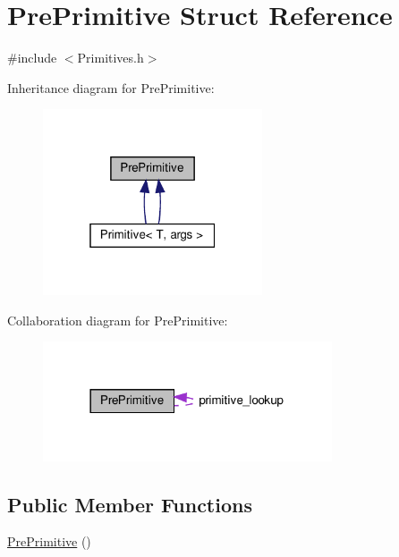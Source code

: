 \hypertarget{struct_pre_primitive}{}\section{Pre\+Primitive Struct Reference}
\label{struct_pre_primitive}


{\ttfamily \#include $<$Primitives.\+h$>$}



Inheritance diagram for Pre\+Primitive\+:\nopagebreak
\begin{figure}[H]
\begin{center}
\leavevmode
\includegraphics[width=184pt]{struct_pre_primitive__inherit__graph}
\end{center}
\end{figure}


Collaboration diagram for Pre\+Primitive\+:\nopagebreak
\begin{figure}[H]
\begin{center}
\leavevmode
\includegraphics[width=242pt]{struct_pre_primitive__coll__graph}
\end{center}
\end{figure}
\subsection*{Public Member Functions}
\begin{DoxyCompactItemize}
\item 
\hyperlink{struct_pre_primitive_a8a96c30ad34b1f19f0539eea4d0423f6}{Pre\+Primitive} ()
\end{DoxyCompactItemize}
